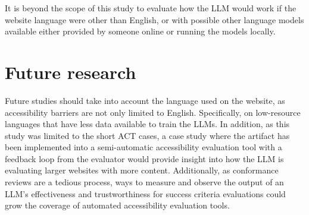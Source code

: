 It is beyond the scope of this study to evaluate how the LLM would work if the website language were other than English, or with possible other language models available either provided by someone online or running the models locally.

\section{Future research}

Future studies should take into account the language used on the website, as accessibility barriers are not only limited to English. Specifically, on low-resource languages that have less data available to train the LLMs. In addition, as this study was limited to the short ACT cases, a case study where the artifact has been implemented into a semi-automatic accessibility evaluation tool with a feedback loop from the evaluator would provide insight into how the LLM is evaluating larger websites with more content. Additionally, as conformance reviews are a tedious process, ways to measure and observe the output of an LLM's effectiveness and trustworthiness for success criteria evaluations could grow the coverage of automated accessibility evaluation tools.

